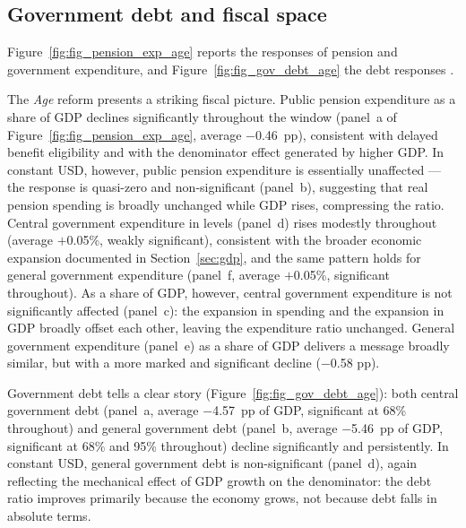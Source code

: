 \documentclass[11pt,english,a4paper, twoside, authoryear]{article}
\begin{document}



\FloatBarrier
\subsection{Government debt and fiscal space}
\label{sec:fiscal}


Figure~\ref{fig:fig_pension_exp_age} reports the responses of pension and government expenditure, and Figure~\ref{fig:fig_gov_debt_age} the debt responses%
.

The \textit{Age} reform presents a striking fiscal picture. Public pension expenditure as a share of GDP declines significantly throughout the window (panel~a of Figure~\ref{fig:fig_pension_exp_age}, average $-$0.46~pp), consistent with delayed benefit eligibility and with the denominator effect generated by higher GDP. In constant USD, however, public pension expenditure is essentially unaffected --- the response is quasi-zero and non-significant (panel~b), suggesting that real pension spending is broadly unchanged while GDP rises, compressing the ratio. Central government expenditure in levels (panel~d) rises modestly throughout (average $+$0.05\%, weakly significant), consistent with the broader economic expansion documented in Section~\ref{sec:gdp}, and the same pattern holds for general government expenditure (panel~f, average $+$0.05\%, significant throughout).  As a share of GDP, however, central government expenditure is not significantly affected (panel~c): the expansion in spending and the expansion in GDP broadly offset each other, leaving the expenditure ratio unchanged. General government expenditure (panel~e) as a share of GDP delivers a message broadly similar, but with a more marked and significant decline ($-$0.58 pp).


Government debt tells a clear story (Figure~\ref{fig:fig_gov_debt_age}): both central government debt (panel~a, average $-$4.57~pp of GDP, significant at 68\% throughout) and general government debt (panel~b, average $-$5.46~pp of GDP, significant at 68\% and 95\% throughout) decline significantly and persistently. In constant USD, general government debt is non-significant (panel~d), again reflecting the mechanical effect of GDP growth on the denominator: the debt ratio improves primarily because the economy grows, not because debt falls in absolute terms.

\end{document}
